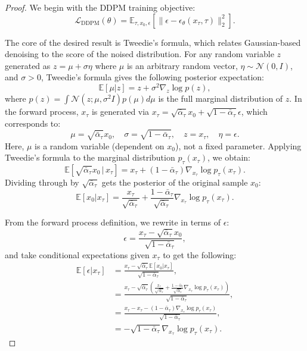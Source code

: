 \begin{proof}
We begin with the DDPM training objective:
\begin{equation}
\mathcal{L}_\text{DDPM}(\theta) = \mathbb{E}_{\tau, x_0, \epsilon} \left[ \|\epsilon - \epsilon_\theta(x_\tau, \tau)\|_2^2 \right].
\end{equation}

The core of the desired result is Tweedie's formula, which relates Gaussian-based denoising to the score of the noised distribution. For any random variable $z$ generated as $z = \mu + \sigma \eta$ where $\mu$ is an arbitrary random vector, $\eta \sim \mathcal{N}(0, I)$, and $\sigma > 0$, Tweedie's formula gives the following posterior expectation:
\begin{equation}
\mathbb{E}[\mu | z] = z + \sigma^2 \nabla_z \log p(z),
\end{equation}
where $p(z) = \int \mathcal{N}(z; \mu, \sigma^2 I) p(\mu)d\mu$ is the full marginal distribution of $z$. In the forward process, $x_\tau$ is generated via $x_\tau = \sqrt{\bar{\alpha}_\tau}x_0 + \sqrt{1 - \bar{\alpha}_\tau}\epsilon$, which corresponds to:
\begin{equation}
\mu = \sqrt{\bar{\alpha}_\tau}x_0, \quad \sigma = \sqrt{1 - \bar{\alpha}_\tau}, \quad z = x_\tau, \quad \eta = \epsilon.
\end{equation}
Here, $\mu$ is a random variable (dependent on $x_0$), not a fixed parameter. Applying Tweedie's formula to the marginal distribution $p_\tau(x_\tau)$, we obtain:
\begin{equation}
\mathbb{E}\left[\sqrt{\bar{\alpha}_\tau}x_0 \,\big|\, x_\tau\right] = x_\tau + (1 - \bar{\alpha}_\tau)\nabla_{x_\tau} \log p_\tau(x_\tau).
\end{equation}
Dividing through by $\sqrt{\bar{\alpha}_\tau}$ gets the posterior of the original sample $x_0$:
\begin{equation}
\mathbb{E}[x_0 | x_\tau] = \frac{x_\tau}{\sqrt{\bar{\alpha}_\tau}} + \frac{1 - \bar{\alpha}_\tau}{\sqrt{\bar{\alpha}_\tau}} \nabla_{x_\tau} \log p_\tau(x_\tau).
\end{equation}

From the forward process definition, we rewrite in terms of $\epsilon$:
\begin{equation}
\epsilon = \frac{x_\tau - \sqrt{\bar{\alpha}_\tau}x_0}{\sqrt{1 - \bar{\alpha}_\tau}},
\end{equation}
and take conditional expectations given $x_\tau$ to get the following:
\begin{align}
    \mathbb{E}[\epsilon | x_\tau] &= \frac{x_\tau - \sqrt{\bar{\alpha}_\tau}\mathbb{E}[x_0 | x_\tau]}{\sqrt{1 - \bar{\alpha}_\tau}},\\
    &= \frac{x_\tau - \sqrt{\bar{\alpha}_\tau}\left( \frac{x_\tau}{\sqrt{\bar{\alpha}_\tau}} + \frac{1 - \bar{\alpha}_\tau}{\sqrt{\bar{\alpha}_\tau}} \nabla_{x_\tau} \log p_\tau(x_\tau) \right)}{\sqrt{1 - \bar{\alpha}_\tau}},\\
    &= \frac{x_\tau - x_\tau - (1 - \bar{\alpha}_\tau)\nabla_{x_\tau} \log p_\tau(x_\tau)}{\sqrt{1 - \bar{\alpha}_\tau}},\\
    &= -\sqrt{1 - \bar{\alpha}_\tau} \nabla_{x_\tau} \log p_\tau(x_\tau).
\end{align}


\end{proof}
